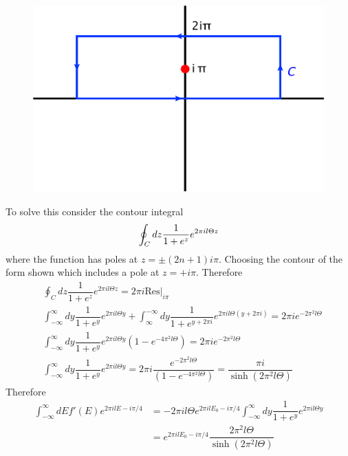 \documentclass[aps,prb,onecolumn,notitlepage,showpacs,floatfix,superscriptaddress]{revtex4-1}
\begin{document}
\begin{figure}[ht]
\includegraphics[scale=0.06]{contour.png} 
\end{figure}
To solve this consider the contour integral
\begin{equation}
\oint_C dz  \dfrac{1}{1+e^{z}} e^{2\pi i l \Theta z } \\
\end{equation}
where the function has poles at $z=\pm (2n+1)i \pi$. Choosing the contour of the form shown which includes a pole at $z=+i\pi$. Therefore
\begin{equation}
\begin{split}
&\oint_C dz  \dfrac{1}{1+e^{z}} e^{2\pi i l \Theta z } = 2\pi i \text{Res} \vert_{i\pi} \\
&\int_{-\infty}^\infty dy  \dfrac{1}{1+e^{y}} e^{2\pi i l \Theta y } + \int_{\infty}^{-\infty} dy  \dfrac{1}{1+e^{y+2\pi i}} e^{2\pi i l \Theta (y+2 \pi i) }  = 2\pi i  e^{-2\pi^2 l \Theta }\\
&\int_{-\infty}^\infty dy  \dfrac{1}{1+e^{y}} e^{2\pi i l \Theta y } (1-e^{-4\pi^2 l \Theta })  = 2\pi i  e^{-2\pi^2 l \Theta } \\
&\int_{-\infty}^\infty dy  \dfrac{1}{1+e^{y}} e^{2\pi i l \Theta y }   = 2\pi i  \dfrac{e^{-2\pi^2 l \Theta }}{(1-e^{-4\pi^2 l \Theta })} = \dfrac{\pi i}{\sinh(2\pi^2 l \Theta)}
\end{split}
\end{equation}
Therefore
\begin{equation}
\begin{split}
\int_{-\infty}^\infty dE  f'(E ) e^{2\pi i l E -i\pi /4} &= -2\pi i l \Theta e^{2\pi i l  E_0 -i\pi /4} \int_{-\infty}^\infty dy  \dfrac{1}{1+e^{y}} e^{2\pi i l \Theta y } \\
&=  e^{2\pi i l  E_0 -i\pi /4} \dfrac{2\pi^2  l \Theta}{\sinh(2\pi^2 l \Theta)} \\
 \end{split}
\end{equation}
\end{document}
